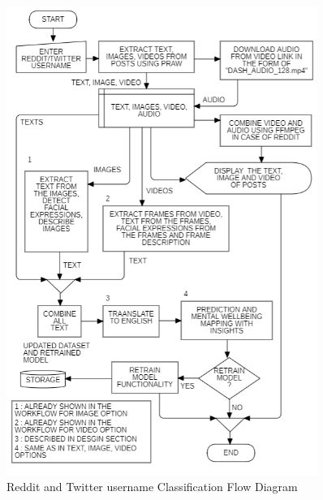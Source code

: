\pagebreak
\begin{figure}[h!]  
    \centering
    \includegraphics[width=0.9\textwidth]{Images/APP REDDIT.png}  
    \caption*{Reddit and Twitter username Classification Flow Diagram}
    \label{01234i}  %
\end{figure}


\pagebreak











